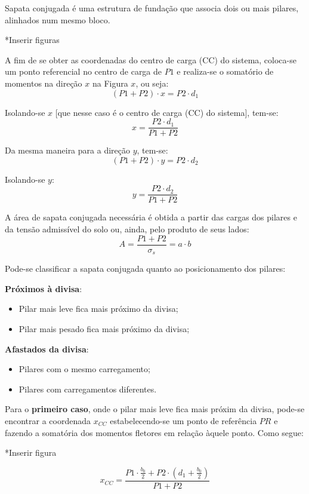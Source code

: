 Sapata conjugada é uma estrutura de fundação que associa dois ou mais pilares, alinhados num mesmo bloco.

*Inserir figuras

A fim de se obter as coordenadas do centro de carga (CC) do sistema, coloca-se um ponto referencial no centro de carga de $P1$ e realiza-se o somatório de momentos na direção $x$ na Figura $x$, ou seja:
$$(P1+P2)\cdot x=P2\cdot d_1$$

Isolando-se $x$ [que nesse caso é o centro de carga (CC) do sistema], tem-se:
\begin{equation}x=\frac{P2\cdot d_1}{P1+P2}\end{equation}

Da mesma maneira para a direção $y$, tem-se:
$$(P1+P2)\cdot y=P2\cdot d_2$$

Isolando-se $y$:
\begin{equation}y=\frac{P2\cdot d_2}{P1+P2}\end{equation}

A área de sapata conjugada necessária é obtida a partir das cargas dos pilares e da tensão admissível do solo ou, ainda, pelo produto de seus lados:
\begin{equation}A=\frac{P1+P2}{\sigma_s}=a\cdot b\end{equation}

Pode-se classificar a sapata conjugada quanto ao posicionamento dos pilares:

\textbf{Próximos à divisa}:
\begin{itemize}
	\item Pilar mais leve fica mais próximo da divisa;
	\item Pilar mais pesado fica mais próximo da divisa;
\end{itemize}

\textbf{Afastados da divisa}:
\begin{itemize}
	\item Pilares com o mesmo carregamento;
	\item Pilares com carregamentos diferentes.
\end{itemize}

Para o \textbf{primeiro caso}, onde o pilar mais leve fica mais próxim da divisa, pode-se encontrar a coordenada $x_{CC}$ estabelecendo-se um ponto de referência $PR$ e fazendo a somatória dos momentos fletores em relação àquele ponto. Como segue:

*Inserir figura

$$x_{CC}=\frac{P1\cdot\displaystyle\frac{b_0}{2}+P2\cdot\left(d_1+\displaystyle\frac{b_0}{2}\right)}{P1+P2}$$

